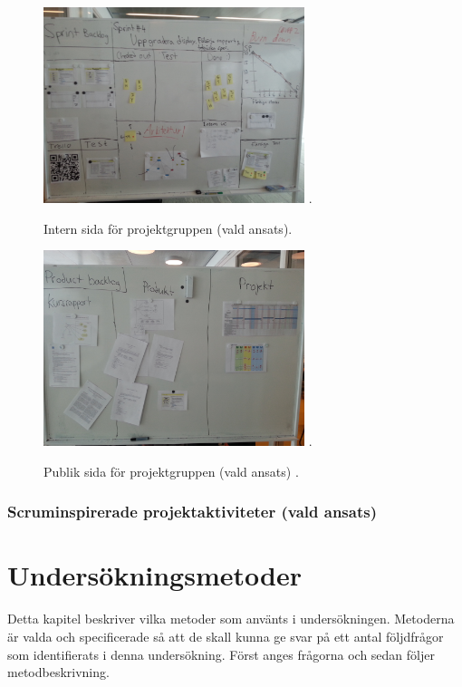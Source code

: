 \documentclass[conference,a4paper]{IEEEtran}
\begin{document}
\begin{figure}[H]
\centering
\includegraphics[width=3in]{varsprint}
\DeclareGraphicsExtensions.
\caption{Intern sida för projektgruppen (vald ansats).}
\label{varsprint}
\end{figure}

\begin{figure}[H]
\centering
\includegraphics[width=3in]{varproduct}
\DeclareGraphicsExtensions.
\caption{Publik sida för projektgruppen (vald ansats) .}
\label{varproduct}
\end{figure}


\subsubsection{Scruminspirerade projektaktiviteter (vald ansats)}



\section{Undersökningsmetoder} \label{sec:under}
Detta kapitel beskriver vilka metoder som använts i undersökningen. Metoderna är valda och specificerade så att de skall kunna ge svar på ett antal följdfrågor som identifierats i denna undersökning. Först anges frågorna och sedan följer metodbeskrivning.
\end{document}

